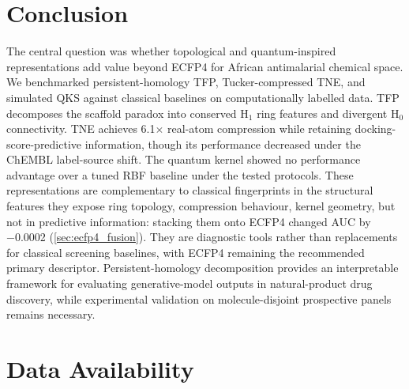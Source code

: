 \documentclass[11pt,a4paper]{article}
\providecommand{\DIFaddbegin}{} %
\providecommand{\DIFaddend}{} %
\newcommand{\DIFaddincludegraphics}[2][]{{\color{blue}\fbox{\DIFOincludegraphics[#1]{#2}}}} %
\DeclareRobustCommand{\DIFaddbegin}{\DIFOaddbegin \let\includegraphics\DIFaddincludegraphics} %
\DeclareRobustCommand{\DIFaddend}{\DIFOaddend \let\includegraphics\DIFOincludegraphics} %
\begin{document}

\section{Conclusion}\DIFaddbegin \label{sec:conclusion}
\DIFaddend 

The central question was whether topological and quantum-inspired representations add value beyond ECFP4 for African antimalarial chemical space. We benchmarked persistent-homology TFP, Tucker-compressed TNE, and simulated QKS against classical baselines on computationally labelled data. TFP decomposes the scaffold paradox into conserved H$_1$ ring features and divergent H$_0$ connectivity. TNE achieves \num{6.1}$\times$ real-atom compression while retaining docking-score-predictive information, though its performance decreased under the ChEMBL label-source shift. The quantum kernel showed no performance advantage over a tuned RBF baseline under the tested protocols. These representations are complementary to classical fingerprints in the structural features they expose ring topology, compression behaviour, kernel geometry, but not in predictive information: stacking them onto ECFP4 changed AUC by \num{-0.0002} (\cref{sec:ecfp4_fusion}). They are diagnostic tools rather than replacements for classical screening baselines, with ECFP4 remaining the recommended primary descriptor. Persistent-homology decomposition provides an interpretable framework for evaluating generative-model outputs in natural-product drug discovery, while experimental validation on molecule-disjoint prospective panels remains necessary.


\section*{Data Availability}
\end{document}
